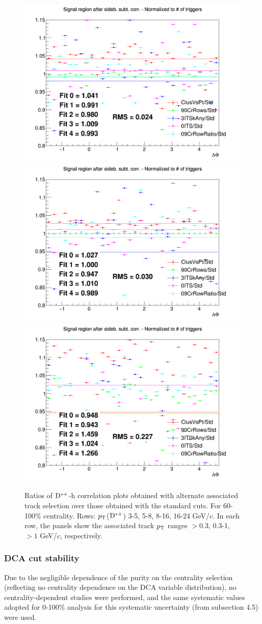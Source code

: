 \begin{figure}
{\includegraphics[width=0.31\linewidth]{figuresVsCent/Dstar/SystTrackEff/AssTrackSyst_60100/Ratio_AzimCorrDistr_Dstar_Canvas_PtIntBins10to10_PoolInt_thr03to99_ASS_60100.png}}
{\includegraphics[width=0.31\linewidth]{figuresVsCent/Dstar/SystTrackEff/AssTrackSyst_60100/Ratio_AzimCorrDistr_Dstar_Canvas_PtIntBins10to10_PoolInt_thr03to1_ASS_60100.png}}
{\includegraphics[width=0.31\linewidth]{figuresVsCent/Dstar/SystTrackEff/AssTrackSyst_60100/Ratio_AzimCorrDistr_Dstar_Canvas_PtIntBins10to10_PoolInt_thr1to99_ASS_60100.png}} \\


 \caption{Ratios of ${\rm D^{*+}}$-h correlation plots obtained with alternate associated track selection over those obtained with the standard cuts. For 60-100\% centrality. Rows: $p_{\rm T}$(${\rm D^{*+}}$) 3-5, 5-8, 8-16, 16-24 GeV/$c$. In each row, the panels show the associated track
$p_{\rm T}$ ranges $> 0.3$, 0.3-1, $> 1$ GeV/$c$, respectively.}
\label{fig:SysTrEff60100_Dstar}
\end{figure}
\clearpage

\subsubsection{DCA cut stability}
Due to the negligible dependence of the purity on the centrality selection (reflecting no centrality dependence on the DCA variable  distribution), no centrality-dependent studies were performed, and the same systematic values adopted for 0-100\% analysis for this systematic uncertainty (from subsection 4.5) were used.

